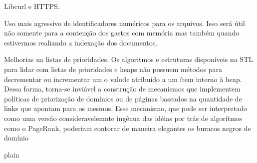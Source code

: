 \documentclass[10pt,twocolumn]{article}
\begin{document}
Libcurl e HTTPS.

Uso mais agressivo de identificadores numéricos para os arquivos. Isso será
útil não somente para a contenção dos gastos com memória mas também quando
estivermos realiando a indexação dos documentos.

Melhorias na listas de prioridades. Os algoritmos e estruturas disponíveis na
STL para lidar com listas de prioridades e heaps não possuem métodos para
decrementar ou incrementar um o valode atribuído a um ítem interno à heap.
Dessa forma, torna-se inviável a construção de mecanismos que implementem
políticas de priorização de domínios ou de páginas baseados na quantidade de
links que apontam para os mesmos. Esse mecanismo, que pode ser interpretado
como uma versão consideravelemnte ingênua das idéias por trás de algorítmos
como o PageRank, poderiam contorar de maneira elegantes os buracos negros de
domínio

\nocite{stroustrup97}
 {plain}

\end{document}
